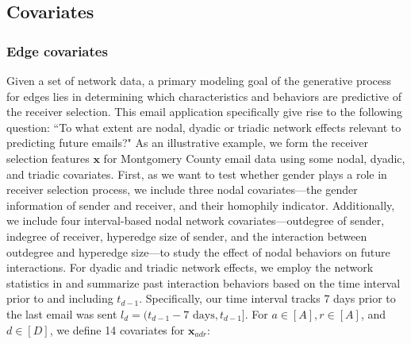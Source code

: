 \documentclass[ba]{imsart}
\numberwithin{equation}{section}
\theoremstyle{plain}
\begin{document}
 	   \subsection{Covariates}\label{subsec:Covariates_email}
 	   \subsubsection{Edge covariates}
 	   Given a set of network data, a primary modeling goal of the generative process for edges lies in determining which characteristics and behaviors are predictive of the receiver selection. This email application specifically give rise to the following question: ``To what extent are nodal, dyadic or triadic network effects relevant to predicting future emails?" As an illustrative example, we form the receiver selection features $\boldsymbol{x}$ for Montgomery County email data using some nodal, dyadic, and triadic covariates. First, as we want to test whether gender plays a role in receiver selection process, we include three nodal covariates---the gender information of sender and receiver, and their homophily indicator. Additionally, we include four interval-based nodal network covariates---outdegree of sender, indegree of receiver, hyperedge size of sender, and the interaction between outdegree and hyperedge size---to study the effect of nodal behaviors on future interactions. For dyadic and triadic network effects, we employ the network statistics in \cite{PerryWolfe2012} and summarize past interaction behaviors based on the time interval prior to and including $t_{d-1}$. Specifically, our time interval tracks 7 days prior to the last email was sent $l_d = (t_{d-1}-7\mbox{ days}, t_{d-1}]$. For $a \in [A], r \in [A]$, and $d \in [D]$, we define 14 covariates for $\boldsymbol{x}_{adr}$:
\end{document}
